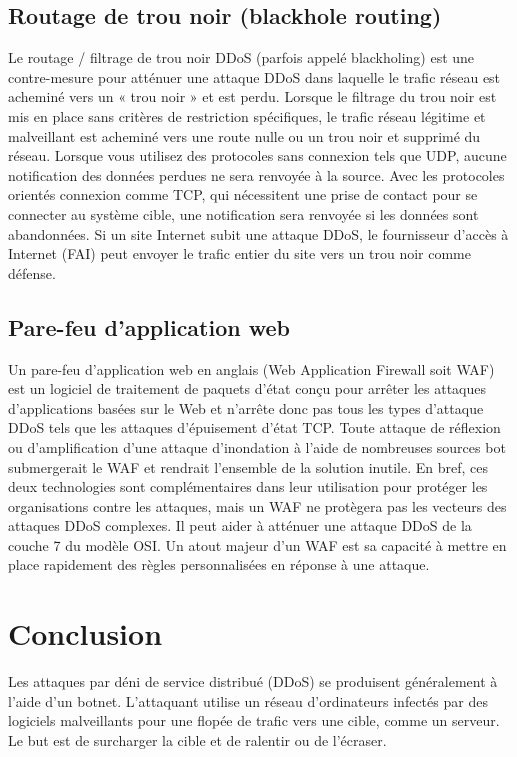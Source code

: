 	\subsection{Routage de trou noir (blackhole routing)}
	Le routage / filtrage de trou noir DDoS (parfois appelé blackholing) est une contre-mesure pour atténuer une attaque DDoS dans laquelle le trafic réseau est acheminé vers un « trou noir » et est perdu. Lorsque le filtrage du trou noir est mis en place sans critères de restriction spécifiques, le trafic réseau légitime et malveillant est acheminé vers une route nulle ou un trou noir et supprimé du réseau. Lorsque vous utilisez des protocoles sans connexion tels que UDP, aucune notification des données perdues ne sera renvoyée à la source. Avec les protocoles orientés connexion comme TCP, qui nécessitent une prise de contact pour se connecter au système cible, une notification sera renvoyée si les données sont abandonnées. Si un site Internet subit une attaque DDoS, le fournisseur d’accès à Internet (FAI) peut envoyer le trafic entier du site vers un trou noir comme défense.


	\subsection{Pare-feu d’application web}
	Un pare-feu d’application web en anglais (Web Application Firewall soit WAF) est un logiciel de traitement de paquets d’état conçu pour arrêter les attaques d’applications basées sur le Web et n’arrête donc pas tous les types d’attaque DDoS tels que les attaques d’épuisement d’état TCP. Toute attaque de réflexion ou d’amplification d’une attaque d’inondation à l’aide de nombreuses sources bot submergerait le WAF et rendrait l’ensemble de la solution inutile. En bref, ces deux technologies sont complémentaires dans leur utilisation pour protéger les organisations contre les attaques, mais un WAF ne protègera pas les vecteurs des attaques DDoS complexes.
Il peut aider à atténuer une attaque DDoS de la couche 7 du modèle OSI. Un atout majeur d’un WAF est sa capacité à mettre en place rapidement des règles personnalisées en réponse à une attaque.\\

	\pagebreak
	\section{Conclusion} 
	Les attaques par déni de service distribué (DDoS) se produisent généralement à l’aide d’un botnet. L’attaquant utilise un réseau d’ordinateurs infectés par des logiciels malveillants pour une flopée de trafic vers une cible, comme un serveur. Le but est de surcharger la cible et de ralentir ou de l’écraser.\\
	
